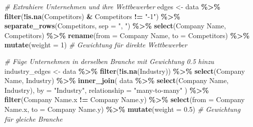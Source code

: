\documentclass[
]{article}
\newenvironment{Shaded}{\begin{snugshade}}{\end{snugshade}}
\newcommand{\AttributeTok}[1]{\textcolor[rgb]{0.13,0.29,0.53}{#1}}
\newcommand{\CommentTok}[1]{\textcolor[rgb]{0.56,0.35,0.01}{\textit{#1}}}
\newcommand{\DecValTok}[1]{\textcolor[rgb]{0.00,0.00,0.81}{#1}}
\newcommand{\FloatTok}[1]{\textcolor[rgb]{0.00,0.00,0.81}{#1}}
\newcommand{\FunctionTok}[1]{\textcolor[rgb]{0.13,0.29,0.53}{\textbf{#1}}}
\newcommand{\NormalTok}[1]{#1}
\newcommand{\OtherTok}[1]{\textcolor[rgb]{0.56,0.35,0.01}{#1}}
\newcommand{\SpecialCharTok}[1]{\textcolor[rgb]{0.81,0.36,0.00}{\textbf{#1}}}
\newcommand{\StringTok}[1]{\textcolor[rgb]{0.31,0.60,0.02}{#1}}
\begin{document}
\begin{Shaded}
\begin{Highlighting}[]
\CommentTok{\# Extrahiere Unternehmen und ihre Wettbewerber}
\NormalTok{edges }\OtherTok{\textless{}{-}}\NormalTok{ data }\SpecialCharTok{\%\textgreater{}\%}
  \FunctionTok{filter}\NormalTok{(}\SpecialCharTok{!}\FunctionTok{is.na}\NormalTok{(Competitors) }\SpecialCharTok{\&}\NormalTok{ Competitors }\SpecialCharTok{!=} \StringTok{"{-}1"}\NormalTok{) }\SpecialCharTok{\%\textgreater{}\%}
  \FunctionTok{separate\_rows}\NormalTok{(Competitors, }\AttributeTok{sep =} \StringTok{", "}\NormalTok{) }\SpecialCharTok{\%\textgreater{}\%}
  \FunctionTok{select}\NormalTok{(}\StringTok{\textasciigrave{}}\AttributeTok{Company Name}\StringTok{\textasciigrave{}}\NormalTok{, Competitors) }\SpecialCharTok{\%\textgreater{}\%}
  \FunctionTok{rename}\NormalTok{(}\AttributeTok{from =} \StringTok{\textasciigrave{}}\AttributeTok{Company Name}\StringTok{\textasciigrave{}}\NormalTok{, }\AttributeTok{to =}\NormalTok{ Competitors) }\SpecialCharTok{\%\textgreater{}\%}
  \FunctionTok{mutate}\NormalTok{(}\AttributeTok{weight =} \DecValTok{1}\NormalTok{)  }\CommentTok{\# Gewichtung für direkte Wettbewerber}

\CommentTok{\# Füge Unternehmen in derselben Branche mit Gewichtung 0.5 hinzu}
\NormalTok{industry\_edges }\OtherTok{\textless{}{-}}\NormalTok{ data }\SpecialCharTok{\%\textgreater{}\%}
  \FunctionTok{filter}\NormalTok{(}\SpecialCharTok{!}\FunctionTok{is.na}\NormalTok{(Industry)) }\SpecialCharTok{\%\textgreater{}\%}
  \FunctionTok{select}\NormalTok{(}\StringTok{\textasciigrave{}}\AttributeTok{Company Name}\StringTok{\textasciigrave{}}\NormalTok{, Industry) }\SpecialCharTok{\%\textgreater{}\%}
  \FunctionTok{inner\_join}\NormalTok{(}
\NormalTok{    data }\SpecialCharTok{\%\textgreater{}\%} \FunctionTok{select}\NormalTok{(}\StringTok{\textasciigrave{}}\AttributeTok{Company Name}\StringTok{\textasciigrave{}}\NormalTok{, Industry),}
    \AttributeTok{by =} \StringTok{"Industry"}\NormalTok{,}
    \AttributeTok{relationship =} \StringTok{"many{-}to{-}many"}
\NormalTok{  ) }\SpecialCharTok{\%\textgreater{}\%}
  \FunctionTok{filter}\NormalTok{(}\StringTok{\textasciigrave{}}\AttributeTok{Company Name.x}\StringTok{\textasciigrave{}} \SpecialCharTok{!=} \StringTok{\textasciigrave{}}\AttributeTok{Company Name.y}\StringTok{\textasciigrave{}}\NormalTok{) }\SpecialCharTok{\%\textgreater{}\%}
  \FunctionTok{select}\NormalTok{(}\AttributeTok{from =} \StringTok{\textasciigrave{}}\AttributeTok{Company Name.x}\StringTok{\textasciigrave{}}\NormalTok{, }\AttributeTok{to =} \StringTok{\textasciigrave{}}\AttributeTok{Company Name.y}\StringTok{\textasciigrave{}}\NormalTok{) }\SpecialCharTok{\%\textgreater{}\%}
  \FunctionTok{mutate}\NormalTok{(}\AttributeTok{weight =} \FloatTok{0.5}\NormalTok{)  }\CommentTok{\# Gewichtung für gleiche Branche}


\end{Highlighting}
\end{Shaded}
\end{document}
